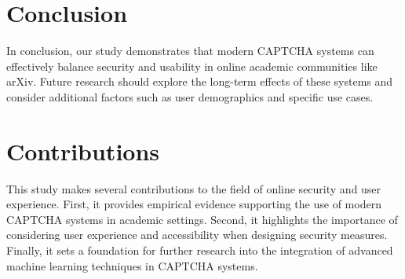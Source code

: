 \documentclass{article}
\begin{document}
\section{Conclusion}
In conclusion, our study demonstrates that modern CAPTCHA systems can effectively balance security and usability in online academic communities like arXiv. Future research should explore the long-term effects of these systems and consider additional factors such as user demographics and specific use cases.

\section{Contributions}
This study makes several contributions to the field of online security and user experience. First, it provides empirical evidence supporting the use of modern CAPTCHA systems in academic settings. Second, it highlights the importance of considering user experience and accessibility when designing security measures. Finally, it sets a foundation for further research into the integration of advanced machine learning techniques in CAPTCHA systems.



\end{document}
